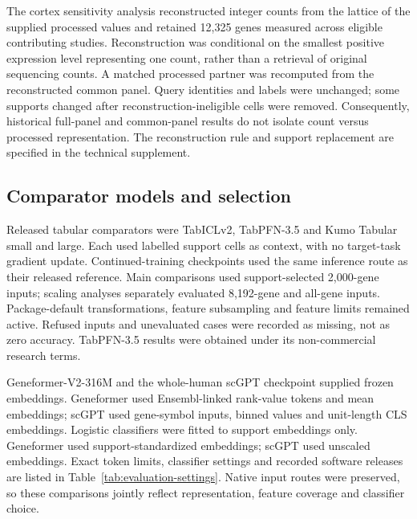 The cortex sensitivity analysis reconstructed integer counts from the lattice of the supplied processed values and retained 12,325 genes measured across eligible contributing studies. Reconstruction was conditional on the smallest positive expression level representing one count, rather than a retrieval of original sequencing counts. A matched processed partner was recomputed from the reconstructed common panel. Query identities and labels were unchanged; some supports changed after reconstruction-ineligible cells were removed. Consequently, historical full-panel and common-panel results do not isolate count versus processed representation. The reconstruction rule and support replacement are specified in the technical supplement.

\subsection*{Comparator models and selection}

Released tabular comparators were TabICLv2, TabPFN-3.5 and Kumo Tabular small and large\cite{qu2026tabiclv2,jaeger2026tabpfn35,nvidia2026kumo}. Each used labelled support cells as context, with no target-task gradient update. Continued-training checkpoints used the same inference route as their released reference. Main comparisons used support-selected 2,000-gene inputs; scaling analyses separately evaluated 8,192-gene and all-gene inputs. Package-default transformations, feature subsampling and feature limits remained active. Refused inputs and unevaluated cases were recorded as missing, not as zero accuracy. TabPFN-3.5 results were obtained under its non-commercial research terms\cite{priorlabs2026tabpfn35card}.

Geneformer-V2-316M\cite{chen2026geneformer} and the whole-human scGPT checkpoint\cite{cui2024scgpt} supplied frozen embeddings. Geneformer used Ensembl-linked rank-value tokens and mean embeddings; scGPT used gene-symbol inputs, binned values and unit-length CLS embeddings. Logistic classifiers were fitted to support embeddings only. Geneformer used support-standardized embeddings; scGPT used unscaled embeddings. Exact token limits, classifier settings and recorded software releases are listed in Table~\ref{tab:evaluation-settings}. Native input routes were preserved, so these comparisons jointly reflect representation, feature coverage and classifier choice.

